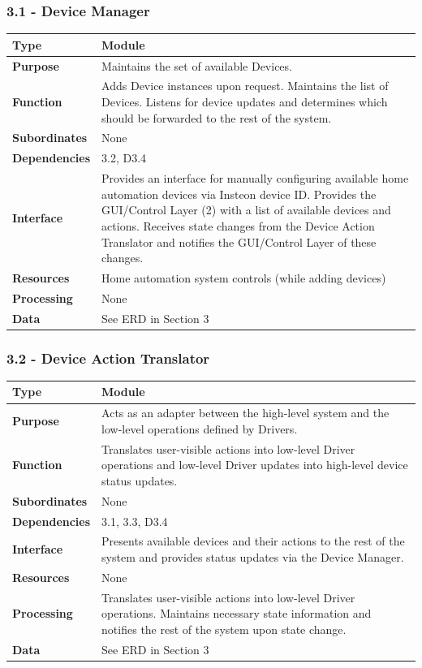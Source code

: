 \documentclass{article}
\begin{document}
\subsubsection*{3.1 - Device Manager}
\begin{tabular}{ | l |  p{13.3cm} |}
\hline
\textbf{Type} & Module \\ \hline
\textbf{Purpose} & Maintains the set of available Devices. \\ \hline
\textbf{Function} & Adds Device instances upon request. Maintains the list of
Devices. Listens for device updates and determines which should be forwarded
to the rest of the system. \\ \hline
\textbf{Subordinates} & None \\ \hline
\textbf{Dependencies} & 3.2, D3.4 \\ \hline
\textbf{Interface} & Provides an interface for manually configuring available
home automation devices via Insteon device ID. Provides the GUI/Control Layer
(2) with a list of available devices and actions. Receives state changes from
the Device Action Translator and notifies the GUI/Control Layer of these changes. \\ \hline
\textbf{Resources} & Home automation system controls (while adding devices) \\ \hline
\textbf{Processing} & None \\ \hline
\textbf{Data} & See ERD in Section 3 \\ \hline
\end{tabular}

\subsubsection*{3.2 - Device Action Translator}
\begin{tabular}{ | l |  p{13.3cm} |}
\hline
\textbf{Type} & Module \\ \hline
\textbf{Purpose} & Acts as an adapter between the high-level system and the
low-level operations defined by Drivers. \\ \hline
\textbf{Function} & Translates user-visible actions into low-level Driver
operations and low-level Driver updates into high-level device status updates.
\\ \hline
\textbf{Subordinates} & None \\ \hline
\textbf{Dependencies} & 3.1, 3.3, D3.4 \\ \hline
\textbf{Interface} & Presents available devices and their actions to the
rest of the system and provides status updates via the Device Manager. \\ \hline
\textbf{Resources} & None \\ \hline
\textbf{Processing} & Translates user-visible actions into low-level Driver
operations. Maintains necessary state information and notifies the rest of the
system upon state change. \\ \hline
\textbf{Data} & See ERD in Section 3 \\ \hline
\end{tabular}
\end{document}
